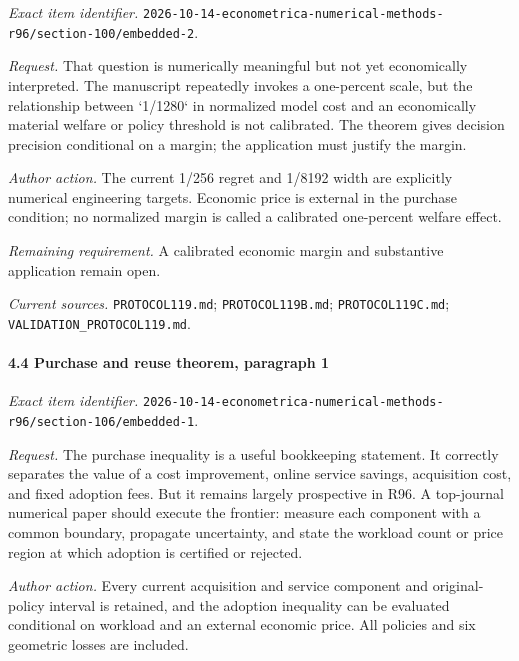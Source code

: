 \emph{Exact item identifier.} \nolinkurl{2026-10-14-econometrica-numerical-methods-r96/section-100/embedded-2}.

\par\emph{Request.} That question is numerically meaningful but not yet economically interpreted. The manuscript repeatedly invokes a one-percent scale, but the relationship between `1/1280` in normalized model cost and an economically material welfare or policy threshold is not calibrated. The theorem gives decision precision conditional on a margin; the application must justify the margin.

\par\emph{Author action.} The current 1/256 regret and 1/8192 width are explicitly numerical engineering targets. Economic price is external in the purchase condition; no normalized margin is called a calibrated one-percent welfare effect.

\par\emph{Remaining requirement.} A calibrated economic margin and substantive application remain open.

\par\emph{Current sources.} \nolinkurl{PROTOCOL119.md}; \nolinkurl{PROTOCOL119B.md}; \nolinkurl{PROTOCOL119C.md}; \nolinkurl{VALIDATION_PROTOCOL119.md}.

\paragraph{4.4 Purchase and reuse theorem, paragraph 1}

\emph{Exact item identifier.} \nolinkurl{2026-10-14-econometrica-numerical-methods-r96/section-106/embedded-1}.

\par\emph{Request.} The purchase inequality is a useful bookkeeping statement. It correctly separates the value of a cost improvement, online service savings, acquisition cost, and fixed adoption fees. But it remains largely prospective in R96. A top-journal numerical paper should execute the frontier: measure each component with a common boundary, propagate uncertainty, and state the workload count or price region at which adoption is certified or rejected.

\par\emph{Author action.} Every current acquisition and service component and original-policy interval is retained, and the adoption inequality can be evaluated conditional on workload and an external economic price. All policies and six geometric losses are included.

